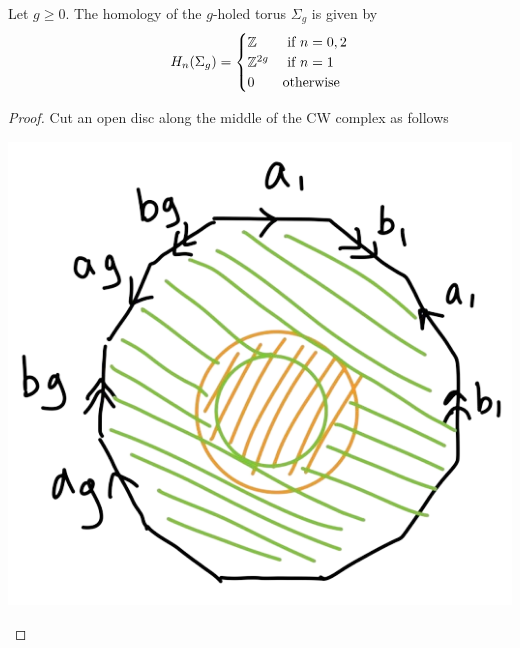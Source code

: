 \documentclass[a4paper]{article}
\begin{document}
\begin{thm}{}{} Let $g\geq 0$. The homology of the $g$-holed torus $\Sigma_g$ is given by $$H_n(\Sigma_g)=\begin{cases}
\mathbb{Z} & \text{ if } n=0,2\\
\mathbb{Z}^{2g} & \text{ if } n=1\\
0 & \text{otherwise}
\end{cases}$$ \tcbline
\begin{proof}
Cut an open disc along the middle of the CW complex as follows

\begin{center}
\includegraphics[scale = 0.3]{Image 4}
\end{center}


\end{proof}
\end{thm}
\end{document}
